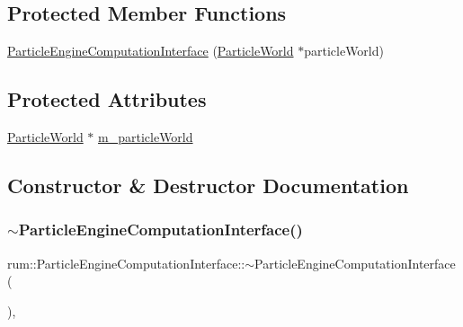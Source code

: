 \subsection*{Protected Member Functions}
\begin{DoxyCompactItemize}
\item 
\mbox{\hyperlink{classrum_1_1_particle_engine_computation_interface_a6422693afe286ef363e1bc3045d6a3b8}{Particle\+Engine\+Computation\+Interface}} (\mbox{\hyperlink{classrum_1_1_particle_world}{Particle\+World}} $\ast$particle\+World)
\end{DoxyCompactItemize}
\subsection*{Protected Attributes}
\begin{DoxyCompactItemize}
\item 
\mbox{\hyperlink{classrum_1_1_particle_world}{Particle\+World}} $\ast$ \mbox{\hyperlink{classrum_1_1_particle_engine_computation_interface_a624427ffa7e9bdbaa4acd28f36d6e9ca}{m\+\_\+particle\+World}}
\end{DoxyCompactItemize}


\subsection{Constructor \& Destructor Documentation}
\mbox{\label{classrum_1_1_particle_engine_computation_interface_a97b19bc41506e144f85836e6036a9d0d}} 
\subsubsection{\texorpdfstring{$\sim$\+Particle\+Engine\+Computation\+Interface()}{~ParticleEngineComputationInterface()}}
{\footnotesize\ttfamily rum\+::\+Particle\+Engine\+Computation\+Interface\+::$\sim$\+Particle\+Engine\+Computation\+Interface (\begin{DoxyParamCaption}{ }\end{DoxyParamCaption})\hspace{0.3cm}{\ttfamily [virtual]}, {\ttfamily [default]}}

